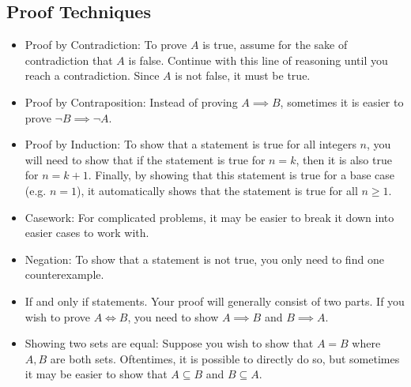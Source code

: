 \documentclass{article}
\begin{document}
    \subsection{Proof Techniques}
    \begin{itemize}
        \item Proof by Contradiction: To prove $A$ is true, assume for the sake of contradiction that $A$ is false. Continue with this line of reasoning until you reach a contradiction. Since $A$ is not false, it must be true.
        \item Proof by Contraposition: Instead of proving $A \implies B$, sometimes it is easier to prove $\neg B \implies \neg A$.
        \item Proof by Induction: To show that a statement is true for all integers $n$, you will need to show that if the statement is true for $n=k$, then it is also true for $n=k+1$. Finally, by showing that this statement is true for a base case (e.g. $n=1$), it automatically shows that the statement is true for all $n \ge 1$.
        \item Casework: For complicated problems, it may be easier to break it down into easier cases to work with.
        \item Negation: To show that a statement is not true, you only need to find one counterexample.
        \item If and only if statements. Your proof will generally consist of two parts. If you wish to prove $A \iff B$, you need to show $A \implies B$ and $B \implies A$.
        \item Showing two sets are equal: Suppose you wish to show that $A=B$ where $A,B$ are both sets. Oftentimes, it is possible to directly do so, but sometimes it may be easier to show that $A \subseteq B$ and $B \subseteq A$.
    \end{itemize}
\end{document}
